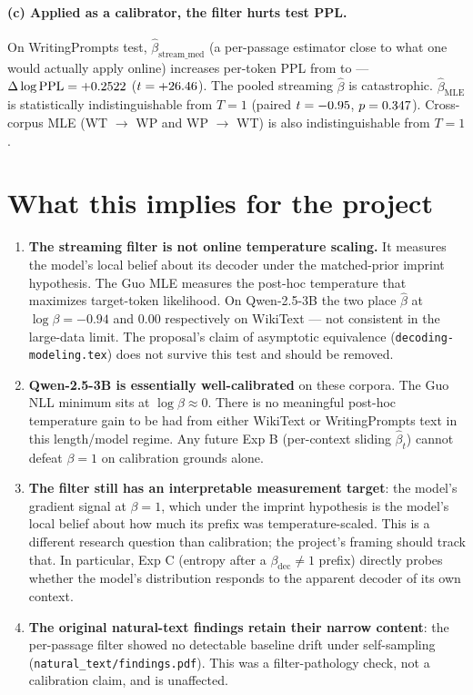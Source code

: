 \documentclass[11pt]{article}
\begin{document}
\paragraph{(c) Applied as a calibrator, the filter hurts test PPL.}
On WritingPrompts test, $\hat\beta_{\mathrm{stream\_med}}$ (a per-passage
estimator close to what one would actually apply online) increases per-token
PPL from  to \calTestPPLWPWPstreammed{} ---
$\Delta\log\mathrm{PPL} = +0.2522$ ($t =
+26.46$).  The pooled streaming $\hat\beta$ is
catastrophic.  $\hat\beta_{\mathrm{MLE}}$ is statistically indistinguishable
from $T = 1$ (paired $t = -0.95$, $p =
0.347$).  Cross-corpus MLE
(WT $\to$ WP and WP $\to$ WT) is also indistinguishable from $T=1$.

\section{What this implies for the project}

\begin{enumerate}
\item \textbf{The streaming filter is not online temperature scaling.}
It measures the model's local belief about its decoder under the matched-prior
imprint hypothesis.  The Guo MLE measures the post-hoc temperature that
maximizes target-token likelihood.  On Qwen-2.5-3B the two place
$\hat\beta$ at $\log\beta = -0.94$ and $0.00$ respectively on WikiText ---
not consistent in the large-data limit.  The proposal's claim of asymptotic
equivalence (\texttt{decoding-modeling.tex}) does not survive this test and
should be removed.

\item \textbf{Qwen-2.5-3B is essentially well-calibrated} on these corpora.
The Guo NLL minimum sits at $\log\beta \approx 0$.  There is no meaningful
post-hoc temperature gain to be had from either WikiText or WritingPrompts
text in this length/model regime.  Any future Exp B (per-context sliding
$\hat\beta_t$) cannot defeat $\beta=1$ on calibration grounds alone.

\item \textbf{The filter still has an interpretable measurement target}:
the model's gradient signal at $\beta=1$, which under the imprint hypothesis
is the model's local belief about how much its prefix was temperature-scaled.
This is a different research question than calibration; the project's
framing should track that.  In particular, Exp C (entropy after a
$\beta_{\mathrm{dec}} \neq 1$ prefix) directly probes whether the model's
distribution responds to the apparent decoder of its own context.

\item \textbf{The original natural-text findings retain their narrow
content}: the per-passage filter showed no detectable baseline drift under
self-sampling (\texttt{natural\_text/findings.pdf}).  This was a
filter-pathology check, not a calibration claim, and is unaffected.
\end{enumerate}
\end{document}
